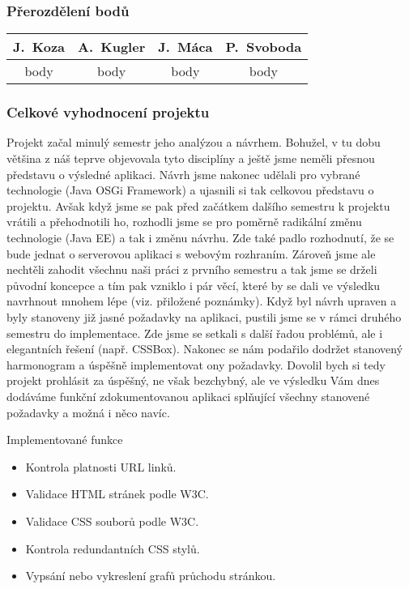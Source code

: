 \documentclass{beamer}
\begin{document}
\begin{frame}[allowframebreaks]\frametitle{Přerozdělení bodů}
    
    \begin{center}
  \begin{tabular}{| c | c | c | c |}
    \hline
     J.~Koza & A.~Kugler & J.~Máca & P.~Svoboda \\
    \hline
     body & body & body & body \\
    \hline
  \end{tabular}     
   \end{center}
\end{frame}

\begin{frame}[allowframebreaks]\frametitle{Celkové vyhodnocení projektu}

	Projekt začal minulý semestr jeho analýzou a návrhem. Bohužel, v tu dobu většina z náš teprve objevovala tyto disciplíny a ještě jsme neměli přesnou představu o výsledné aplikaci. Návrh jsme nakonec udělali pro vybrané technologie (Java OSGi Framework) a ujasnili si tak celkovou představu o projektu. Avšak když jsme se pak před začátkem dalšího semestru k projektu vrátili a přehodnotili ho, rozhodli jsme se pro poměrně radikální změnu technologie (Java EE) a tak i změnu návrhu. Zde také padlo rozhodnutí, že se bude jednat o serverovou aplikaci s webovým rozhraním. Zároveň jsme ale nechtěli zahodit všechnu naši práci z prvního semestru a tak jsme se drželi původní koncepce a tím pak vzniklo i pár věcí, které by se dali ve výsledku navrhnout mnohem lépe (viz. přiložené poznámky). Když byl návrh upraven a byly stanoveny již jasné požadavky na aplikaci, pustili jsme se v rámci druhého semestru do implementace. Zde jsme se setkali s další řadou problémů, ale i elegantních řešení (např. CSSBox). Nakonec se nám podařilo dodržet stanovený harmonogram a úspěšně implementovat ony požadavky. Dovolil bych si tedy projekt prohlásit za úspěšný, ne však bezchybný, ale ve výsledku Vám dnes dodáváme funkční zdokumentovanou aplikaci splňující všechny stanovené požadavky a možná i něco navíc.
	
		\begin{block}{Implementované funkce}
			\begin{itemize}
				\item Kontrola platnosti URL linků.
				\item Validace HTML stránek podle W3C.
				\item Validace CSS souborů podle W3C.
				\item Kontrola redundantních CSS stylů.
				\item Vypsání nebo vykreslení grafů průchodu stránkou.
			\end{itemize}
		\end{block}
   
\end{frame}
\end{document}
